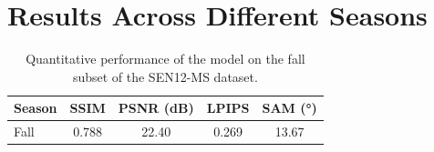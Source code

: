 \chapter{Results Across Different Seasons}
\label{appendix:results_seasons}

\begin{table}[h!]
\centering
\caption[Quantitative results on the fall subset]{Quantitative performance of the model on the fall subset of the SEN12-MS dataset.}
\begin{tabular}{lcccc}
\toprule
\textbf{Season} & \textbf{SSIM} & \textbf{PSNR (dB)} & \textbf{LPIPS} & \textbf{SAM (°)} \\
\midrule
Fall & 0.788 & 22.40 & 0.269 & 13.67 \\
\bottomrule
\end{tabular}
\label{tab:fall_results}
\end{table}


